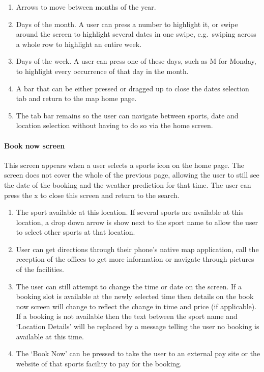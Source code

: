 \begin{enumerate}
	\item Arrows to move between months of the year.
	\item Days of the month. A user can press a number to highlight it, or
		swipe around the screen to highlight several dates in one swipe, e.g.\
		swiping across a whole row to highlight an entire week.
	\item Days of the week. A user can press one of these days, such as M for
		Monday, to highlight every occurrence of that day in the month.
	\item A bar that can be either pressed or dragged up to close the dates
		selection tab and return to the map home page.
	\item The tab bar remains so the user can navigate between sports, date and
		location selection without having to do so via the home screen.
\end{enumerate}

\paragraph{Book now screen}

This screen appears when a user selects a sports icon on the home page. The
screen does not cover the whole of the previous page, allowing the user to
still see the date of the booking and the weather prediction for that time. The
user can press the x to close this screen and return to the search.

\begin{enumerate}
	\item The sport available at this location. If several sports are available
		at this location, a drop down arrow is show next to the sport name to
		allow the user to select other sports at that location.
	\item User can get directions through their phone's native map application,
		call the reception of the offices to get more information or navigate
		through pictures of the facilities.
	\item The user can still attempt to change the time or date on the screen.
		If a booking slot is available at the newly selected time then details
		on the book now screen will change to reflect the change in time and
		price (if applicable). If a booking is not available then the text
		between the sport name and `Location Details' will be replaced by a
		message telling the user no booking is available at this time.
	\item The `Book Now' can be pressed to take the user to an external pay
		site or the website of that sports facility to pay for the booking.
\end{enumerate}

